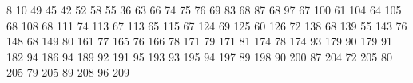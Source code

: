 8 10
49 45
42 52
58 55
36 63
66 74
75 76
69 83
68 87
68 97
67 100
61 104
64 105
68 108
68 111
74 113
67 113
65 115
67 124
69 125
60 126
72 138
68 139
55 143
76 148
68 149
80 161
77 165
76 166
78 171
79 171
81 174
78 174
93 179
90 179
91 182
94 186
94 189
92 191
95 193
93 195
94 197
89 198
90 200
87 204
72 205
80 205
79 205
89 208
96 209
